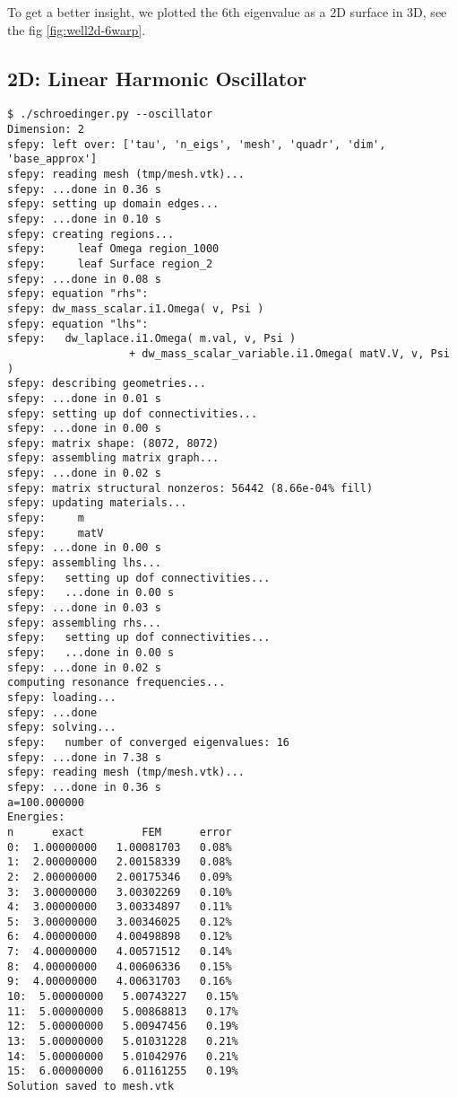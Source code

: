 



To get a better insight, we plotted the 6th eigenvalue as a 2D surface in 3D,
see the fig \ref{fig:well2d-6warp}.


\subsection{2D: Linear Harmonic Oscillator}

\begin{lstlisting}
$ ./schroedinger.py --oscillator
Dimension: 2
sfepy: left over: ['tau', 'n_eigs', 'mesh', 'quadr', 'dim', 'base_approx']
sfepy: reading mesh (tmp/mesh.vtk)...
sfepy: ...done in 0.36 s
sfepy: setting up domain edges...
sfepy: ...done in 0.10 s
sfepy: creating regions...
sfepy:     leaf Omega region_1000
sfepy:     leaf Surface region_2
sfepy: ...done in 0.08 s
sfepy: equation "rhs":
sfepy: dw_mass_scalar.i1.Omega( v, Psi )
sfepy: equation "lhs":
sfepy:   dw_laplace.i1.Omega( m.val, v, Psi )
                   + dw_mass_scalar_variable.i1.Omega( matV.V, v, Psi )
sfepy: describing geometries...
sfepy: ...done in 0.01 s
sfepy: setting up dof connectivities...
sfepy: ...done in 0.00 s
sfepy: matrix shape: (8072, 8072)
sfepy: assembling matrix graph...
sfepy: ...done in 0.02 s
sfepy: matrix structural nonzeros: 56442 (8.66e-04% fill)
sfepy: updating materials...
sfepy:     m
sfepy:     matV
sfepy: ...done in 0.00 s
sfepy: assembling lhs...
sfepy:   setting up dof connectivities...
sfepy:   ...done in 0.00 s
sfepy: ...done in 0.03 s
sfepy: assembling rhs...
sfepy:   setting up dof connectivities...
sfepy:   ...done in 0.00 s
sfepy: ...done in 0.02 s
computing resonance frequencies...
sfepy: loading...
sfepy: ...done
sfepy: solving...
sfepy:   number of converged eigenvalues: 16
sfepy: ...done in 7.38 s
sfepy: reading mesh (tmp/mesh.vtk)...
sfepy: ...done in 0.36 s
a=100.000000
Energies:
n      exact         FEM      error
0:  1.00000000   1.00081703   0.08%
1:  2.00000000   2.00158339   0.08%
2:  2.00000000   2.00175346   0.09%
3:  3.00000000   3.00302269   0.10%
4:  3.00000000   3.00334897   0.11%
5:  3.00000000   3.00346025   0.12%
6:  4.00000000   4.00498898   0.12%
7:  4.00000000   4.00571512   0.14%
8:  4.00000000   4.00606336   0.15%
9:  4.00000000   4.00631703   0.16%
10:  5.00000000   5.00743227   0.15%
11:  5.00000000   5.00868813   0.17%
12:  5.00000000   5.00947456   0.19%
13:  5.00000000   5.01031228   0.21%
14:  5.00000000   5.01042976   0.21%
15:  6.00000000   6.01161255   0.19%
Solution saved to mesh.vtk
\end{lstlisting}

